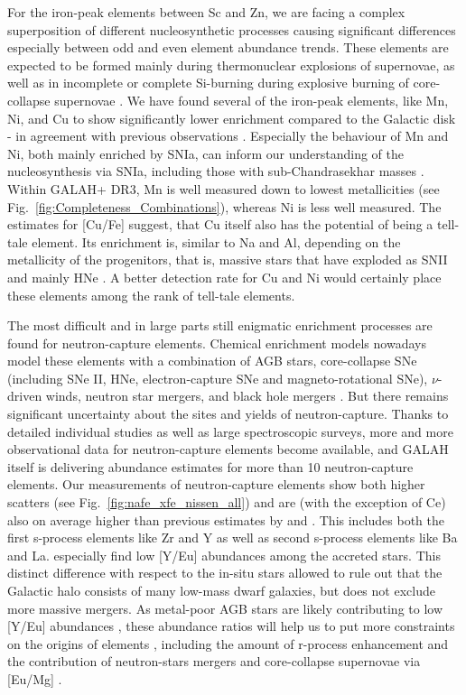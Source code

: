 \documentclass[fleqn,usenatbib]{mnras}
\begin{document}
For the iron-peak elements between Sc and Zn, we are facing a complex superposition of different nucleosynthetic processes causing significant differences especially between odd and even element abundance trends. These elements are expected to be formed mainly during thermonuclear explosions of supernovae, as well as in incomplete or complete Si-burning during explosive burning of core-collapse supernovae \citep{Kobayashi2020}. We have found several of the iron-peak elements, like Mn, Ni, and Cu to show significantly lower enrichment compared to the Galactic disk - in agreement with previous observations \citep{Nissen2010, Nissen2011, Hawkins2015, Hayes2018}. Especially the behaviour of Mn and Ni, both mainly enriched by SNIa, can inform our understanding of the nucleosynthesis via SNIa, including those with sub-Chandrasekhar masses \citep{Sanders2021}. Within GALAH+ DR3, Mn is well measured down to lowest metallicities (see Fig.~\ref{fig:Completeness_Combinations}), whereas Ni is less well measured. The estimates for [Cu/Fe] suggest, that Cu itself also has the potential of being a tell-tale element. Its enrichment is, similar to Na and Al, depending on the metallicity of the progenitors, that is, massive stars that have exploded as SNII and mainly HNe \citep{Kobayashi2020}. A better detection rate for Cu and Ni would certainly place these elements among the rank of tell-tale elements.

The most difficult and in large parts still enigmatic enrichment processes are found for neutron-capture elements. Chemical enrichment models nowadays model these elements with a combination of AGB stars, core-collapse SNe (including SNe II, HNe, electron-capture SNe and magneto-rotational SNe), $\nu$-driven winds, neutron star mergers, and black hole mergers \citep[see][and references therein]{Kobayashi2020}. But there remains significant uncertainty about the sites and yields of neutron-capture. Thanks to detailed individual studies as well as large spectroscopic surveys, more and more observational data for neutron-capture elements become available, and GALAH itself is delivering abundance estimates for more than 10 neutron-capture elements. Our measurements of neutron-capture elements show both higher scatters (see Fig.~\ref{fig:nafe_xfe_nissen_all}) and are (with the exception of Ce) also on average higher than previous estimates by \citet{Nissen2011} and \citet{Fishlock2017}. This includes both the first s-process elements like Zr and Y as well as second s-process elements like Ba and La. \citet{Fishlock2017} especially find low [Y/Eu] abundances among the accreted stars. This distinct difference with respect to the in-situ stars allowed \citet{Venn2004} to rule out that the Galactic halo consists of many low-mass dwarf galaxies, but does not exclude more massive mergers. As metal-poor AGB stars are likely contributing to low [Y/Eu] abundances \citep{Venn2004}, these abundance ratios will help us to put more constraints on the origins of elements \citep[see also][]{Recio-Blanco2021}, including the amount of r-process enhancement \citep{Aguado2021} and the contribution of neutron-stars mergers and core-collapse supernovae via [Eu/Mg] \citep{Matsuno2021}.
\end{document}
